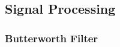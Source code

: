 















\subsection{Signal Processing}

\subsubsection{Butterworth Filter}
\label{sec:butterworth-filter}

